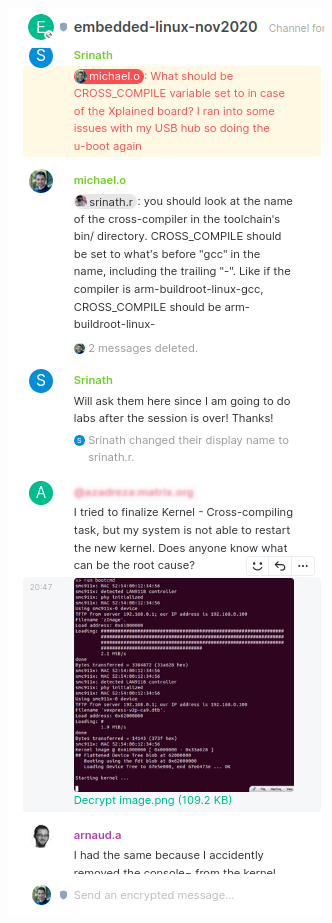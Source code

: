 \begin{frame}
\begin{columns}
  \includegraphics[height=0.8\textheight]{slides/course-information/matrix-screenshot.png}
\end{columns}
\end{frame}
